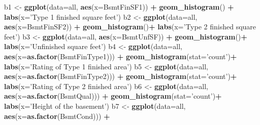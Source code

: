 \documentclass[]{article}
\newenvironment{Shaded}{\begin{snugshade}}{\end{snugshade}}
\newcommand{\DataTypeTok}[1]{\textcolor[rgb]{0.13,0.29,0.53}{#1}}
\newcommand{\KeywordTok}[1]{\textcolor[rgb]{0.13,0.29,0.53}{\textbf{#1}}}
\newcommand{\NormalTok}[1]{#1}
\newcommand{\OperatorTok}[1]{\textcolor[rgb]{0.81,0.36,0.00}{\textbf{#1}}}
\newcommand{\StringTok}[1]{\textcolor[rgb]{0.31,0.60,0.02}{#1}}
\begin{document}
\begin{Shaded}
\begin{Highlighting}[]
\NormalTok{b1 <-}\StringTok{ }\KeywordTok{ggplot}\NormalTok{(}\DataTypeTok{data=}\NormalTok{all, }\KeywordTok{aes}\NormalTok{(}\DataTypeTok{x=}\NormalTok{BsmtFinSF1)) }\OperatorTok{+}
\StringTok{        }\KeywordTok{geom_histogram}\NormalTok{() }\OperatorTok{+}\StringTok{ }\KeywordTok{labs}\NormalTok{(}\DataTypeTok{x=}\StringTok{'Type 1 finished square feet'}\NormalTok{)}
\NormalTok{b2 <-}\StringTok{ }\KeywordTok{ggplot}\NormalTok{(}\DataTypeTok{data=}\NormalTok{all, }\KeywordTok{aes}\NormalTok{(}\DataTypeTok{x=}\NormalTok{BsmtFinSF2)) }\OperatorTok{+}
\StringTok{        }\KeywordTok{geom_histogram}\NormalTok{()}\OperatorTok{+}\StringTok{ }\KeywordTok{labs}\NormalTok{(}\DataTypeTok{x=}\StringTok{'Type 2 finished square feet'}\NormalTok{)}
\NormalTok{b3 <-}\StringTok{ }\KeywordTok{ggplot}\NormalTok{(}\DataTypeTok{data=}\NormalTok{all, }\KeywordTok{aes}\NormalTok{(}\DataTypeTok{x=}\NormalTok{BsmtUnfSF)) }\OperatorTok{+}
\StringTok{        }\KeywordTok{geom_histogram}\NormalTok{()}\OperatorTok{+}\StringTok{ }\KeywordTok{labs}\NormalTok{(}\DataTypeTok{x=}\StringTok{'Unfinished square feet'}\NormalTok{)}
\NormalTok{b4 <-}\StringTok{ }\KeywordTok{ggplot}\NormalTok{(}\DataTypeTok{data=}\NormalTok{all, }\KeywordTok{aes}\NormalTok{(}\DataTypeTok{x=}\KeywordTok{as.factor}\NormalTok{(BsmtFinType1))) }\OperatorTok{+}
\StringTok{        }\KeywordTok{geom_histogram}\NormalTok{(}\DataTypeTok{stat=}\StringTok{'count'}\NormalTok{)}\OperatorTok{+}\StringTok{ }\KeywordTok{labs}\NormalTok{(}\DataTypeTok{x=}\StringTok{'Rating of Type 1 finished area'}\NormalTok{)}
\NormalTok{b5 <-}\StringTok{ }\KeywordTok{ggplot}\NormalTok{(}\DataTypeTok{data=}\NormalTok{all, }\KeywordTok{aes}\NormalTok{(}\DataTypeTok{x=}\KeywordTok{as.factor}\NormalTok{(BsmtFinType2))) }\OperatorTok{+}
\StringTok{        }\KeywordTok{geom_histogram}\NormalTok{(}\DataTypeTok{stat=}\StringTok{'count'}\NormalTok{)}\OperatorTok{+}\StringTok{ }\KeywordTok{labs}\NormalTok{(}\DataTypeTok{x=}\StringTok{'Rating of Type 2 finished area'}\NormalTok{)}
\NormalTok{b6 <-}\StringTok{ }\KeywordTok{ggplot}\NormalTok{(}\DataTypeTok{data=}\NormalTok{all, }\KeywordTok{aes}\NormalTok{(}\DataTypeTok{x=}\KeywordTok{as.factor}\NormalTok{(BsmtQual))) }\OperatorTok{+}
\StringTok{        }\KeywordTok{geom_histogram}\NormalTok{(}\DataTypeTok{stat=}\StringTok{'count'}\NormalTok{)}\OperatorTok{+}\StringTok{ }\KeywordTok{labs}\NormalTok{(}\DataTypeTok{x=}\StringTok{'Height of the basement'}\NormalTok{)}
\NormalTok{b7 <-}\StringTok{ }\KeywordTok{ggplot}\NormalTok{(}\DataTypeTok{data=}\NormalTok{all, }\KeywordTok{aes}\NormalTok{(}\DataTypeTok{x=}\KeywordTok{as.factor}\NormalTok{(BsmtCond))) }\OperatorTok{+}

\end{Highlighting}
\end{Shaded}
\end{document}
